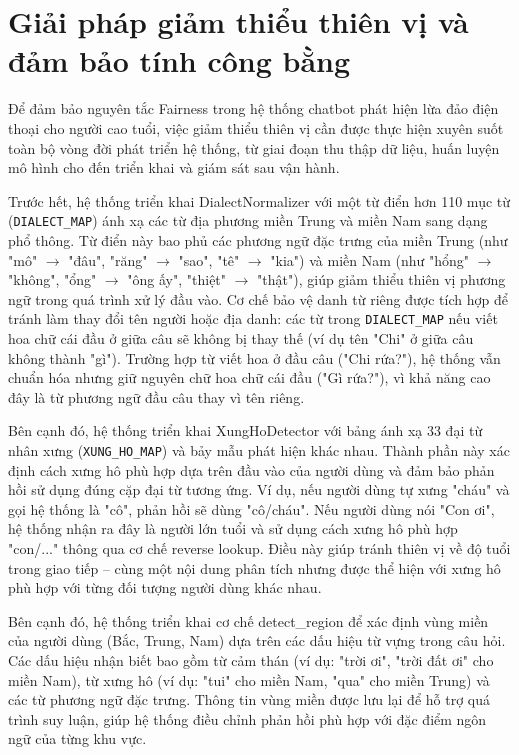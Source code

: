 \section{Giải pháp giảm thiểu thiên vị và đảm bảo tính công bằng}
Để đảm bảo nguyên tắc Fairness trong hệ thống chatbot phát hiện lừa đảo điện thoại cho người cao tuổi, việc giảm thiểu thiên vị cần được thực hiện xuyên suốt toàn bộ vòng đời phát triển hệ thống, từ giai đoạn thu thập dữ liệu, huấn luyện mô hình cho đến triển khai và giám sát sau vận hành.

Trước hết, hệ thống triển khai DialectNormalizer với một từ điển hơn 110 mục từ (\texttt{DIALECT\_MAP}) ánh xạ các từ địa phương miền Trung và miền Nam sang dạng phổ thông. Từ điển này bao phủ các phương ngữ đặc trưng của miền Trung (như "mô" $\rightarrow$ "đâu", "răng" $\rightarrow$ "sao", "tê" $\rightarrow$ "kia") và miền Nam (như "hổng" $\rightarrow$ "không", "ổng" $\rightarrow$ "ông ấy", "thiệt" $\rightarrow$ "thật"), giúp giảm thiểu thiên vị phương ngữ trong quá trình xử lý đầu vào. Cơ chế bảo vệ danh từ riêng được tích hợp để tránh làm thay đổi tên người hoặc địa danh: các từ trong \texttt{DIALECT\_MAP} nếu viết hoa chữ cái đầu ở giữa câu sẽ không bị thay thế (ví dụ tên "Chi" ở giữa câu không thành "gì"). Trường hợp từ viết hoa ở đầu câu ("Chi rứa?"), hệ thống vẫn chuẩn hóa nhưng giữ nguyên chữ hoa chữ cái đầu ("Gì rứa?"), vì khả năng cao đây là từ phương ngữ đầu câu thay vì tên riêng.

Bên cạnh đó, hệ thống triển khai XungHoDetector với bảng ánh xạ 33 đại từ nhân xưng (\texttt{XUNG\_HO\_MAP}) và bảy mẫu phát hiện khác nhau. Thành phần này xác định cách xưng hô phù hợp dựa trên đầu vào của người dùng và đảm bảo phản hồi sử dụng đúng cặp đại từ tương ứng. Ví dụ, nếu người dùng tự xưng "cháu" và gọi hệ thống là "cô", phản hồi sẽ dùng "cô/cháu". Nếu người dùng nói "Con ơi", hệ thống nhận ra đây là người lớn tuổi và sử dụng cách xưng hô phù hợp "con/..." thông qua cơ chế reverse lookup. Điều này giúp tránh thiên vị về độ tuổi trong giao tiếp -- cùng một nội dung phân tích nhưng được thể hiện với xưng hô phù hợp với từng đối tượng người dùng khác nhau.

Bên cạnh đó, hệ thống triển khai cơ chế detect\_region để xác định vùng miền của người dùng (Bắc, Trung, Nam) dựa trên các dấu hiệu từ vựng trong câu hỏi. Các dấu hiệu nhận biết bao gồm từ cảm thán (ví dụ: "trời ơi", "trời đất ơi" cho miền Nam), từ xưng hô (ví dụ: "tui" cho miền Nam, "qua" cho miền Trung) và các từ phương ngữ đặc trưng. Thông tin vùng miền được lưu lại để hỗ trợ quá trình suy luận, giúp hệ thống điều chỉnh phản hồi phù hợp với đặc điểm ngôn ngữ của từng khu vực.


